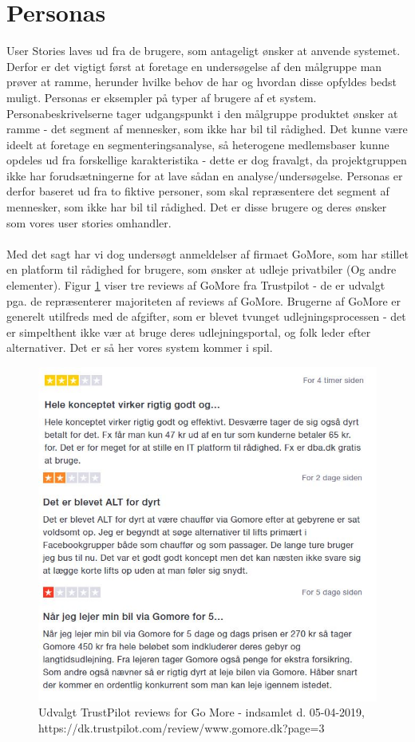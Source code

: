 \documentclass[Kravspecifikation/Kravspec_Main.tex]{subfiles}
\begin{document}
\section{Personas}
User Stories laves ud fra de brugere, som antageligt ønsker at anvende systemet. Derfor er det vigtigt først at foretage en undersøgelse af den målgruppe man prøver at ramme, herunder hvilke behov de har og hvordan disse opfyldes bedst muligt. 
Personas er eksempler på typer af brugere af et system. Personabeskrivelserne tager udgangspunkt i den målgruppe produktet ønsker at ramme - det segment af mennesker, som ikke har bil til rådighed. Det kunne være ideelt at foretage en segmenteringsanalyse, så heterogene medlemsbaser kunne opdeles ud fra forskellige karakteristika - dette er dog fravalgt, da projektgruppen ikke har forudsætningerne for at lave sådan en analyse/undersøgelse. Personas er derfor baseret ud fra to fiktive personer, som skal repræsentere det segment af mennesker, som ikke har bil til rådighed. Det er disse brugere og deres ønsker som vores user stories omhandler.\\\\
Med det sagt har vi dog undersøgt anmeldelser af firmaet GoMore, som har stillet en platform til rådighed for brugere, som ønsker at udleje privatbiler (Og andre elementer). Figur \ref{fig:reviews} viser tre reviews af GoMore fra Trustpilot - de er udvalgt pga. de repræsenterer majoriteten af reviews af GoMore. Brugerne af GoMore er generelt utilfreds med de afgifter, som er blevet tvunget udlejningsprocessen - det er simpelthent ikke vær at bruge deres udlejningsportal, og folk leder efter alternativer. Det er så her vores system kommer i spil. 

\begin{figure}[H]
    \centering
    \includegraphics[width=\textwidth]{Kravspecifikation/Funktionelle_krav/UserStories/graphics/Reviews_GoMore.jpg}
    \caption{Udvalgt TrustPilot reviews for Go More - indsamlet d. 05-04-2019, https://dk.trustpilot.com/review/www.gomore.dk?page=3 }
    \label{fig:reviews}
\end{figure}
\end{document}
